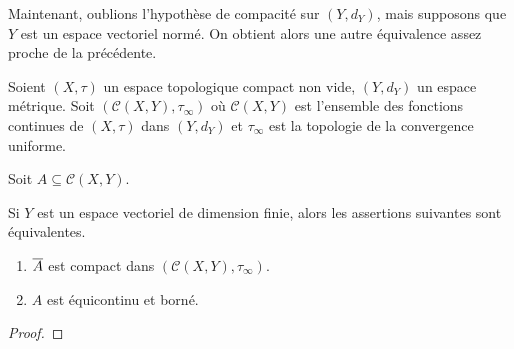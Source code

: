Maintenant, oublions l'hypothèse de compacité sur $(Y, d_{Y})$, mais supposons
que $Y$ est un espace vectoriel normé. On obtient alors une autre équivalence
assez proche de la précédente.

\begin{corollary}
	Soient $(X, \tau)$ un espace topologique compact non vide, $(Y, d_{Y})$ un
	espace métrique. Soit $(\mathcal{C}(X, Y), \tau_{\infty})$ où
	$\mathcal{C}(X, Y)$ est l'ensemble des fonctions continues de $(X, \tau)$
	dans $(Y, d_{Y})$ et $\tau_{\infty}$ est la topologie de la convergence uniforme.

	Soit $A \subseteq \mathcal{C}(X, Y)$.

	Si $Y$ est un espace vectoriel de dimension finie, alors les assertions suivantes sont
	équivalentes.

	\begin{enumerate}
		\item $\overline{A}$ est compact dans $(\mathcal{C}(X, Y), \tau_{\infty})$.
		\item $A$ est équicontinu et borné.
	\end{enumerate}
\end{corollary}

\ifdefined\outputproof
\begin{proof}

\end{proof}
\fi
